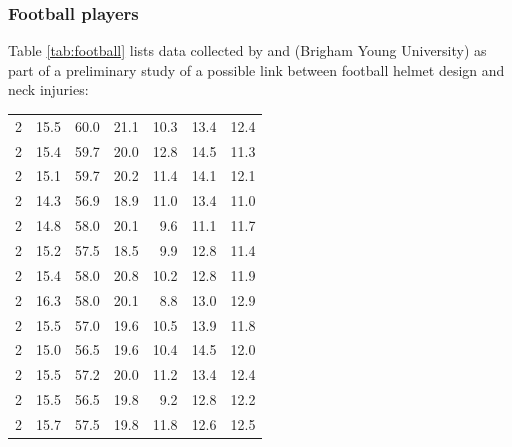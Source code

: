 \subsubsection{Football players}

Table \ref{tab:football} lists data collected by  and  (Brigham Young University) as part of a preliminary study of a possible link between football helmet design and neck injuries:

\begin{center}
  \label{tab:football}
  \tablelasttail{\bottomrule}
    \centering
    \begin{supertabular}{rrrrrrr}
      2     & 15.5 & 60.0   & 21.1  & 10.3  & 13.4  & 12.4  \\
      2     & 15.4 & 59.7   & 20.0  & 12.8  & 14.5  & 11.3  \\
      2     & 15.1 & 59.7   & 20.2  & 11.4  & 14.1  & 12.1  \\
      2     & 14.3 & 56.9   & 18.9  & 11.0  & 13.4  & 11.0  \\
      2     & 14.8 & 58.0   & 20.1  &  9.6  & 11.1  & 11.7  \\
      2     & 15.2 & 57.5   & 18.5  &  9.9  & 12.8  & 11.4  \\
      2     & 15.4 & 58.0   & 20.8  & 10.2  & 12.8  & 11.9  \\
      2     & 16.3 & 58.0   & 20.1  &  8.8  & 13.0  & 12.9  \\
      2     & 15.5 & 57.0   & 19.6  & 10.5  & 13.9  & 11.8  \\
      2     & 15.0 & 56.5   & 19.6  & 10.4  & 14.5  & 12.0  \\
      2     & 15.5 & 57.2   & 20.0  & 11.2  & 13.4  & 12.4  \\
      2     & 15.5 & 56.5   & 19.8  &  9.2  & 12.8  & 12.2  \\
      2     & 15.7 & 57.5   & 19.8  & 11.8  & 12.6  & 12.5  \\

\end{supertabular}
\end{center}
